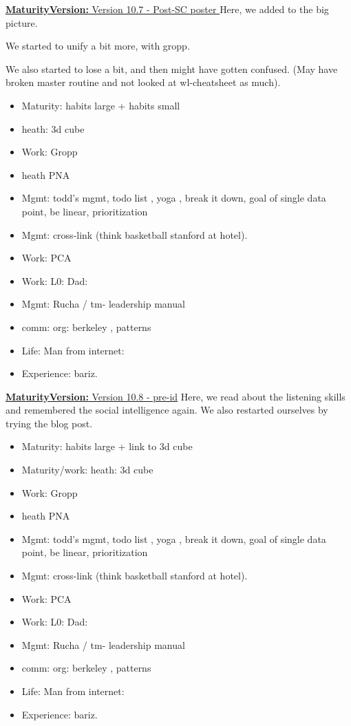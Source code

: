 \documentclass[11pt]{article}
\newcommand{\newMaturityVersion}[1]{\underline{\textbf{MaturityVersion:} #1} }
\begin{document}
\newMaturityVersion{Version 10.7 - Post-SC poster }
Here, we added to the big picture. 

We started to unify a bit more,  with gropp. 

We also started to lose a bit, and then might have gotten confused.  (May have broken master routine and not looked at wl-cheatsheet as much). 
\begin{itemize} 
\item Maturity: habits large + habits small
\item heath: 3d cube 

\item Work: Gropp 
\item heath PNA 
\item Mgmt: todd's mgmt, todo list , yoga , break it down, goal of single data point, be linear, prioritization 
\item Mgmt: cross-link (think basketball stanford at hotel). 

\item Work: PCA
\item Work: L0: Dad: 
\item Mgmt: Rucha / tm- leadership manual 

\item comm: org: berkeley , patterns 
\item Life: Man from internet: 
\item Experience: bariz. 
\end{itemize}

\newMaturityVersion{Version 10.8 - pre-id}
Here, we read about the listening skills and remembered the social intelligence again. 
We also restarted ourselves by trying the blog post. 

\begin{itemize} 
\item Maturity: habits large + link to 3d cube 
\item Maturity/work: heath: 3d cube 
\item Work: Gropp 
\item heath PNA 
\item Mgmt: todd's mgmt, todo list , yoga , break it down, goal of single data point, be linear, prioritization 
\item Mgmt: cross-link (think basketball stanford at hotel). 

\item Work: PCA
\item Work: L0: Dad: 
\item Mgmt: Rucha / tm- leadership manual 

\item comm: org: berkeley , patterns 
\item Life: Man from internet: 
\item Experience: bariz. 
\end{itemize}
\end{document}
